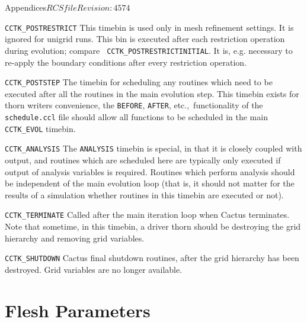 \begin{cactuspart}{Appendices}{$RCSfile$}{$Revision: 4574 $}
\begin{Lentry}
\item[{\tt CCTK\_POSTRESTRICT}]
        This timebin is used only in mesh refinement settings.  It is
        ignored for unigrid runs.  This bin is executed after each
        restriction operation during evolution; compare {\tt
          CCTK\_POSTRESTRICTINITIAL}.  It is, e.g. necessary to
        re-apply the
        boundary conditions after every restriction operation.

\item[{\tt CCTK\_POSTSTEP}]
        The timebin for scheduling any routines which need to be 
        executed after all the routines in the main evolution step. This 
        timebin exists for thorn writers convenience, the {\tt BEFORE}, 
        {\tt AFTER}, etc.,\ functionality of the {\tt schedule.ccl} file
        should allow all functions to be scheduled in the main {\tt CCTK\_EVOL}
        timebin.

\item[{\tt CCTK\_ANALYSIS}]
        The {\tt ANALYSIS} timebin is special, in that it is closely coupled 
        with output, and routines which are scheduled here are typically
        only executed if output of analysis variables is required. 
        Routines which perform analysis should be independent of the main 
        evolution loop (that is, it should not matter for the results
        of a simulation whether routines in this timebin are executed or 
        not). 

\item[{\tt CCTK\_TERMINATE}]
        Called after the main iteration loop when Cactus terminates. 
        Note that sometime, in this timebin, a driver thorn should be 
        destroying the grid hierarchy and removing grid variables. 

\item[{\tt CCTK\_SHUTDOWN}]
        Cactus final shutdown routines, after the grid hierarchy has been 
        destroyed. Grid variables are no longer available.

\end{Lentry}


\chapter{Flesh Parameters}


\end{cactuspart}
